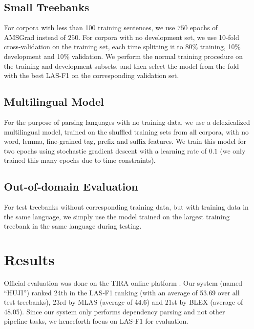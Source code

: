 \documentclass[11pt,a4paper]{article}
\begin{document}
\subsection{Small Treebanks}

For corpora with less than 100 training sentences,
we use $750$ epochs of AMSGrad instead of $250$.
For corpora with no development set,
we use 10-fold cross-validation on the training set,
each time splitting it to 80\% training, 10\% development and 10\% validation.
We perform the normal training procedure on the training and development
subsets, and then select the model from the fold with the best LAS-F1
on the corresponding validation set.

\subsection{Multilingual Model}

For the purpose of parsing languages with no training data,
we use a delexicalized multilingual model, trained on the shuffled training sets
from all corpora, with no word, lemma, fine-grained tag, prefix and suffix features.
We train this model for two epochs using stochastic gradient descent
with a learning rate of $0.1$
(we only trained this many epochs due to time constraints).

\subsection{Out-of-domain Evaluation}

For test treebanks without corresponding training data,
but with training data in the same language,
we simply use the model trained on the largest training treebank in the same language
during testing.


\section{Results}\label{sec:results}

Official evaluation was done on the TIRA online platform \cite{tira}.
Our system (named ``HUJI'') ranked 24th in the LAS-F1 ranking
(with an average of 53.69 over all test treebanks),
23rd by MLAS (average of 44.6) and 21st by BLEX (average of 48.05).
Since our system only performs dependency parsing and not other pipeline tasks,
we henceforth focus on LAS-F1 \cite{nivre17udw} for evaluation.
\end{document}
